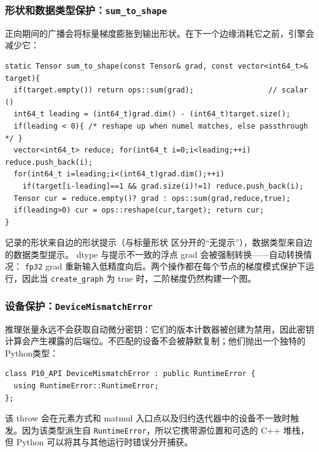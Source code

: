 \subsubsection{形状和数据类型保护：\texttt{sum\_to\_shape}}

正向期间的广播会将标量梯度膨胀到输出形状。在下一个边缘消耗它之前，引擎会减少它：

\begin{lstlisting}[caption={Broadcast recovery: reduce the leading dims and the size-1 broadcast dims, then reshape.}, label=lst:sumtoshape-eval]
static Tensor sum_to_shape(const Tensor& grad, const vector<int64_t>& target){
  if(target.empty()) return ops::sum(grad);                 // scalar ()
  int64_t leading = (int64_t)grad.dim() - (int64_t)target.size();
  if(leading < 0){ /* reshape up when numel matches, else passthrough */ }
  vector<int64_t> reduce; for(int64_t i=0;i<leading;++i) reduce.push_back(i);
  for(int64_t i=leading;i<(int64_t)grad.dim();++i)
    if(target[i-leading]==1 && grad.size(i)!=1) reduce.push_back(i);
  Tensor cur = reduce.empty()? grad : ops::sum(grad,reduce,true);
  if(leading>0) cur = ops::reshape(cur,target); return cur;
}
\end{lstlisting}

记录的形状来自边的形状提示（与标量形状 \texttt{} 区分开的“无提示”），数据类型来自边的数据类型提示。 dtype 与提示不一致的浮点 grad 会被强制转换——自动转换情况： \texttt{fp32} grad 重新输入低精度向后。两个操作都在每个节点的梯度模式保护下运行，因此当 \texttt{create\_graph} 为 true 时，二阶梯度仍然构建一个图。

\subsubsection{设备保护：\texttt{DeviceMismatchError}}

推理张量永远不会获取自动微分密钥：它们的版本计数器被创建为禁用，因此密钥计算会产生裸露的后端位。不匹配的设备不会被静默复制；他们抛出一个独特的Python类型：

\begin{lstlisting}[caption={A distinct exception for device mismatch, derived from the runtime-error base.}, label=lst:devicemismatch]
class P10_API DeviceMismatchError : public RuntimeError {
  using RuntimeError::RuntimeError;
};
\end{lstlisting}

该 throw 会在元素方式和 matmul 入口点以及归约迭代器中的设备不一致时触发。因为该类型派生自 \texttt{RuntimeError}，所以它携带源位置和可选的 C++ 堆栈，但 Python 可以将其与其他运行时错误分开捕获。

